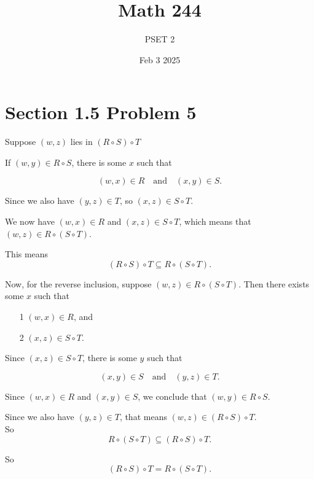 \documentclass{report}
\title{\Huge{Math 244}}
\author{\huge{PSET 2}}
\date{Feb 3 2025}
\begin{document}
\maketitle
\newpage%
\tableofcontents
\pagebreak

\section*{Section 1.5 Problem 5}



\begin{proofWithHibiscus}
  Suppose $(w,z)$ lies in $(R \circ S) \circ T$ 

  If $(w, y) \in R \circ S$, there is some $x$ such that 

  \[ (w,x) \in R \quad \text{and} \quad (x,y) \in S. \]

  Since we also have $(y,z) \in T$, so $(x, z) \in S \circ T$. 

  We now have $(w,x) \in R$ and $(x,z) \in S \circ T$, which means that $(w,z) \in R \circ (S \circ T)$. 

  This means  
  \[ (R \circ S) \circ T \subseteq R \circ (S \circ T). \]

  Now, for the reverse inclusion, suppose $(w,z) \in R \circ (S \circ T)$. Then there exists some $x$ such that 
  \begin{itemize}
    \item [1] $(w,x) \in R$, and 
    \item [2] $(x,z) \in S \circ T$. 
  \end{itemize}

  Since $(x, z) \in S \circ T$, there is some $y$ such that 

  \[ (x,y) \in S \quad \text{and} \quad (y,z) \in T. \]

  Since $(w,x) \in R$ and $(x,y) \in S$, we conclude that $(w,y) \in R \circ S$. 

  Since we also have $(y,z) \in T$, that means $(w,z) \in (R \circ S) \circ T$. \\ 
   
  So 
  \[ R \circ (S \circ T) \subseteq (R \circ S) \circ T. \]

  So  
  \[ (R \circ S) \circ T = R \circ (S \circ T). \]

\end{proofWithHibiscus}
\end{document}
